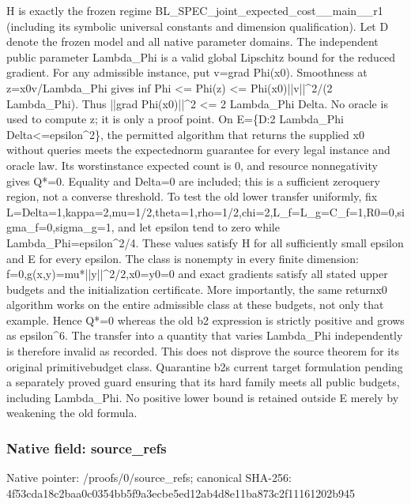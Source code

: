 \documentclass[10pt,a4paper]{article}
\begin{document}
H is exactly the frozen regime BL\_SPEC\_joint\_expected\_cost\_\_main\_\_r1 (including its symbolic universal constants and dimension qualification). Let D denote the frozen model and all native parameter domains. The independent public parameter Lambda\_Phi is a valid global Lipschitz bound for the reduced gradient. For any admissible instance, put v=grad Phi(x0). Smoothness at z=x0v/Lambda\_Phi gives inf Phi <= Phi(z) <= Phi(x0)||v||\textasciicircum{}2/(2 Lambda\_Phi). Thus ||grad Phi(x0)||\textasciicircum{}2 <= 2 Lambda\_Phi Delta. No oracle is used to compute z; it is only a proof point. On E=\{D:2 Lambda\_Phi Delta<=epsilon\textasciicircum{}2\}, the permitted algorithm that returns the supplied x0 without queries meets the expectednorm guarantee for every legal instance and oracle law. Its worstinstance expected count is 0, and resource nonnegativity gives Q*=0. Equality and Delta=0 are included; this is a sufficient zeroquery region, not a converse threshold. To test the old lower transfer uniformly, fix L=Delta=1,kappa=2,mu=1/2\allowbreak{},theta=1,rho=1/2,chi=2,L\allowbreak{}\_f=L\_g=C\_f=1,R0=0,sigma\_\allowbreak{}f=0,sigma\_g=1, and let epsilon tend to zero while Lambda\_Phi=epsilon\textasciicircum{}2/4. These values satisfy H for all sufficiently small epsilon and E for every epsilon. The class is nonempty in every finite dimension: f=0,g(x,y)=mu*||y||\textasciicircum{}2/2,x0=y0=0 and exact gradients satisfy all stated upper budgets and the initialization certificate. More importantly, the same returnx0 algorithm works on the entire admissible class at these budgets, not only that example. Hence Q*=0 whereas the old b2 expression is strictly positive and grows as epsilon\textasciicircum{}6. The transfer into a quantity that varies Lambda\_Phi independently is therefore invalid as recorded. This does not disprove the source theorem for its original primitivebudget class. Quarantine b2s current target formulation pending a separately proved guard ensuring that its hard family meets all public budgets, including Lambda\_Phi. No positive lower bound is retained outside E merely by weakening the old formula.


\subsubsection{Native field: source\_refs}


Native pointer: /proofs/0/source\_refs; canonical SHA-256: 4f53cda18c2baa0c0354bb5f\allowbreak{}9a3ecbe5ed12ab4d8e11ba87\allowbreak{}3c2f11161202b945
\end{document}

